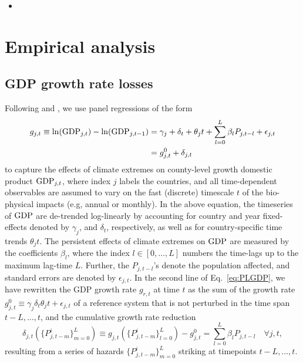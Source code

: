 \documentclass[preprint,3p,authoryear]{elsarticle}
\begin{document}
\begin{itemize}
\item {}
\end{itemize}

\section{Empirical analysis}
\label{sec:empAna}
\subsection{GDP growth rate losses}
\label{subsec:g}
Following \citet{BAK19} and \citet{HSI14}, we use panel regressions of the form
\begin{subequations}
\label{eq:PLGDP}
\begin{align}
  g_{j,t}\equiv \ln(\operatorname{GDP}_{j,t})-\ln(\operatorname{GDP}_{j,t-1}) &= \gamma_j + \delta_{t} + \theta_j t + \sum_{l=0}^{L}\beta_{l}P_{j,t-l}+\epsilon_{j,t}\notag\\
  &= g^{0}_{j,t}+\delta_{j,t}
\end{align}
\end{subequations}
to capture the effects of climate extremes on county-level growth domestic product $\operatorname{GDP}_{j,t}$, where index $j$ labels the countries, and all time-dependent observables are assumed to vary on the fast (discrete) timescale $t$ of the bio-physical impacts (e.g, annual or monthly).
In the above equation, the timeseries of $\operatorname{GDP}$ are de-trended log-linearly by accounting for country and year fixed-effects denoted by $\gamma_j$, and $\delta_t$, respectively, as well as for country-specific time trends $\theta_j t$. The persistent effects of climate extremes on $\operatorname{GDP}$ are measured by the coefficients $\beta_l$, where the index $l\in[0,\ldots,L]$ numbers the time-lags up to the maximum lag-time $L$. Further, the $P_{j,t-l}$'s denote the population affected, and standard errors are denoted by $\epsilon_{j,t}$. In the second line of Eq.~\eqref{eq:PLGDP}, we have rewritten the GDP growth rate $g_{r,t}$ at time $t$ as the sum of the growth rate $g_{j,t}^0\equiv\gamma_j\delta_t\theta_j t+\epsilon_{j,t}$ of a reference system that is not perturbed in the time span $t-L,\ldots,t$, and the cumulative growth rate reduction 
\begin{equation}
  \label{eq:delta}
  \delta_{j,t}\left(\lbrace P_{j,t-m}^i\rbrace_{m=0}^L\right)\equiv g_{j,t}\left(\lbrace P_{j,t-m}^i\rbrace_{l=0}^L\right)-g_{j,t}^0= \sum_{l=0}^L\beta_lP_{j,t-l}\quad\forall j,t,
\end{equation}
resulting from a series of hazards $\lbrace P_{j,t-m}^i\rbrace_{m=0}^L$ striking at timepoints  $t-L,\ldots,t$.
\end{document}

